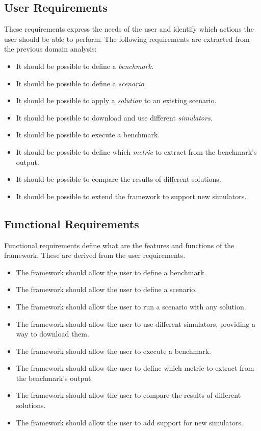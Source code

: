\documentclass[12pt,a4paper,openright,twoside]{book}
\begin{document}
\subsection*{User Requirements}
These requirements express the needs of the user and identify which actions the user should be able to perform.
The following requirements are extracted from the previous domain analysis:
\begin{itemize}
  \item It should be possible to define a \emph{benchmark}.
  \item It should be possible to define a \emph{scenario}.
  \item It should be possible to apply a \emph{solution} to an existing scenario.
  \item It should be possible to download and use different \emph{simulators}.
  \item It should be possible to execute a benchmark.
  \item It should be possible to define which \emph{metric} to extract from the benchmark's output.
  \item It should be possible to compare the results of different solutions.
  \item It should be possible to extend the framework to support new simulators.
\end{itemize}

\subsection*{Functional Requirements}
Functional requirements define what are the features and functions of the framework.
These are derived from the user requirements.

\begin{itemize}
  \item The framework should allow the user to define a benchmark.
  \item The framework should allow the user to define a scenario.
  \item The framework should allow the user to run a scenario with any solution.
  \item The framework should allow the user to use different simulators, providing a way to download them.
  \item The framework should allow the user to execute a benchmark.
  \item The framework should allow the user to define which metric to extract from the benchmark's output.
  \item The framework should allow the user to compare the results of different solutions.
  \item The framework should allow the user to add support for new simulators.
\end{itemize}
\end{document}

